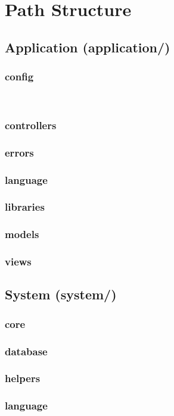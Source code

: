 \documentclass[11pt]{article} %
\begin{document}
\section{Path Structure}
\subsection{Application (application/)}
\subsubsection*{config}
\textbf{} \\
\subsubsection*{controllers}
\subsubsection*{errors}
\subsubsection*{language}
\subsubsection*{libraries}
\subsubsection*{models}
\subsubsection*{views}
\subsection{System (system/)}
\subsubsection*{core}
\subsubsection*{database}
\subsubsection*{helpers}
\subsubsection*{language}
\end{document}
